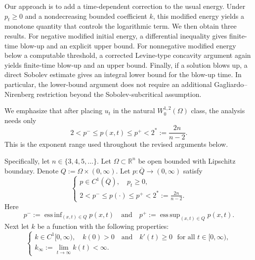 \documentclass[12pt,reqno]{amsart}
\theoremstyle{definition}
\theoremstyle{remark}
\numberwithin{equation}{section}
\DeclareMathOperator*{\esssup}{ess\,sup}
\DeclareMathOperator*{\essinf}{ess\,inf}
\newcommand{\R}{\mathbb{R}}
\begin{document}
Our approach is to add a time-dependent correction to the usual energy. Under $p_t\ge0$ and a nondecreasing bounded coefficient $k$, this modified energy yields a monotone quantity that controls the logarithmic term. We then obtain three results. For negative modified initial energy, a differential inequality gives finite-time blow-up and an explicit upper bound. For nonnegative modified energy below a computable threshold, a corrected Levine-type concavity argument again yields finite-time blow-up and an upper bound. Finally, if a solution blows up, a direct Sobolev estimate gives an integral lower bound for the blow-up time. In particular, the lower-bound argument does not require an additional Gagliardo--Nirenberg restriction beyond the Sobolev-subcritical assumption.

We emphasize that after placing $u_t$ in the natural $W^{1,2}_0(\Omega)$ class, the analysis needs only
\[
2<p^-\le p(x,t)\le p^+<2^*:=\frac{2n}{n-2}.
\]
This is the exponent range used throughout the revised arguments below.

Specifically, let $n \in \{3,4,5,\ldots\}$.
Let $\Omega \subset \R^n$ be open bounded with Lipschitz boundary.
Denote $Q := \Omega \times (0,\infty)$.
Let $p: \overline{Q} \longrightarrow (0,\infty)$ satisfy 
\begin{equation} \label{eq:p-assumption}
	\begin{cases}
		p \in C^1(\overline{Q}), \quad p_t \ge 0,
		\\[2mm]
		\displaystyle
		2 < p^- \le p(\cdot) \le p^+ < 2^*:=\frac{2n}{n-2}.
	\end{cases}
\end{equation}
Here
\[
p^- := \essinf_{(x,t) \in Q} p(x,t)
\quad \mbox{and} \quad
p^+ := \esssup_{(x,t) \in Q} p(x,t).
\]
Next let $k$ be a function with the following properties:
\begin{equation} \label{eq:k-assumption}
	\begin{cases}
		k \in C^1[0,\infty), 
		\quad k(0) > 0
		\quad \mbox{and} \quad
		k'(t) \ge 0  \,\, \mbox{ for all } t \in [0,\infty),
		\\[2mm]
		k_\infty := \displaystyle\lim_{t\to\infty} k(t) < \infty.
	\end{cases}
\end{equation}
\end{document}
